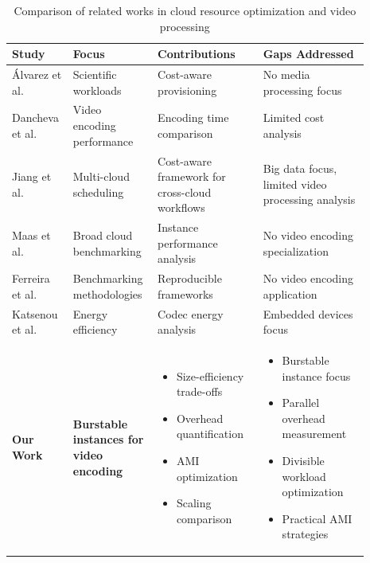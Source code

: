 \documentclass[conference]{IEEEtran}
\begin{document}
	\begin{table}[!htbp]
		\centering
		\caption{Comparison of related works in cloud resource optimization and video processing}
		\label{tab:comparative_analysis}
		\begin{tabular}{|p{0.15\linewidth}|p{0.18\linewidth}|p{0.28\linewidth}|p{0.28\linewidth}|}
			\hline
			\textbf{Study} & \textbf{Focus} & \textbf{Contributions} & \textbf{Gaps Addressed} \\
			\hline
			Álvarez et al. \cite{b2} & Scientific workloads & Cost-aware provisioning & No media processing focus \\
			\hline
			Dancheva et al. \cite{b3} & Video encoding performance & Encoding time comparison & Limited cost analysis \\
			\hline
			Jiang et al. \cite{b20} & Multi-cloud scheduling & Cost-aware framework for cross-cloud workflows & Big data focus, limited video processing analysis \\
			\hline
			Maas et al. \cite{b1} & Broad cloud benchmarking & Instance performance analysis & No video encoding specialization \\
			\hline
			Ferreira et al. \cite{b9} & Benchmarking methodologies & Reproducible frameworks & No video encoding application \\
			\hline
			Katsenou et al. \cite{b8} & Energy efficiency & Codec energy analysis & Embedded devices focus \\
			\hline
			\textbf{Our Work} & \textbf{Burstable instances for video encoding} & 
			\scriptsize
			\begin{itemize}
				\vspace{-0.2cm}
				\item Size-efficiency trade-offs
				\item Overhead quantification  
				\item AMI optimization
				\item Scaling comparison
				\vspace{-0.2cm}
			\end{itemize}
			& 
			\scriptsize
			\begin{itemize}
				\vspace{-0.2cm}
				\item Burstable instance focus
				\item Parallel overhead measurement
				\item Divisible workload optimization
				\item Practical AMI strategies
				\vspace{-0.2cm}
			\end{itemize}
			\\
			\hline
		\end{tabular}
	\end{table}
	
\end{document}
